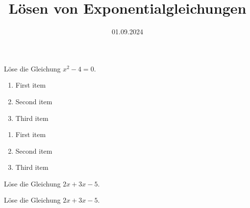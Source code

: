 \documentclass[points=left, 
solution,
12pt
]{exam}
\date{01.09.2024}
\title{Lösen von Exponentialgleichungen}
\begin{document}
Löse die Gleichung \(x^2 - 4 = 0\). \\
\begin{enumerate}
    \item First item
    \item Second item
    \item Third item
\end{enumerate}
\begin{enumerate}[label=\alph*)]
    \item First item
    \item Second item
    \item Third item
\end{enumerate}

\lipsum[1]

Löse die Gleichung \(2x + 3x - 5\).

Löse die Gleichung \(2x + 3x - 5\).
\thinkbubble[Test]


\totalpoints
\end{document}

